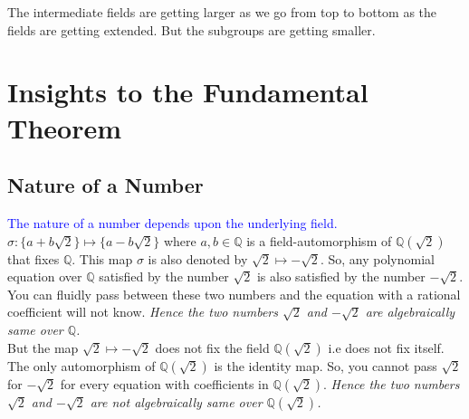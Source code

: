 \vspace{5mm}
\begin{remark}
  The intermediate fields are getting larger as we go from top to bottom  as the fields are getting extended. But the subgroups are getting smaller.
\end{remark}

\vspace{7mm}
\section{Insights to the Fundamental Theorem}

\subsection{Nature of a Number}
\textcolor{blue}{The nature of a number depends upon the underlying field.} \\
\(\sigma:\{a+b\sqrt{2}\} \mapsto \{a-b\sqrt{2}\}\) where \(a,b \in \mathbb{Q}\) is a field-automorphism of  \(\mathbb{Q}(\sqrt{2})\) that fixes \(\mathbb{Q}\). This map \(\sigma \) is also denoted by \(\sqrt{2} \longmapsto -\sqrt{2}\). So, any polynomial equation over \(\mathbb{Q}\) satisfied by the number \(\sqrt{2}\) is also satisfied by the number \(-\sqrt{2}\). You can fluidly pass between these two numbers and the equation with a rational coefficient will not know. \textit{Hence the two numbers \(\sqrt{2}\) and \(-\sqrt{2}\) are algebraically same over \(\mathbb{Q}\).}\\

But the map \(\sqrt{2} \longmapsto -\sqrt{2}\) does not fix the field \(\mathbb{Q}(\sqrt{2})\) i.e does not fix itself. The only automorphism of \(\mathbb{Q}(\sqrt{2})\) is the identity map. So, you cannot pass \(\sqrt{2}\) for \(-\sqrt{2}\) for every equation with coefficients in \(\mathbb{Q}(\sqrt{2})\). \textit{Hence the two numbers \(\sqrt{2}\) and \(-\sqrt{2}\) are not algebraically same over \(\mathbb{Q}(\sqrt{2})\).}
\vspace{7mm}

\begin{figure}[h]
  \centering
    \end{figure}
\clearpage

